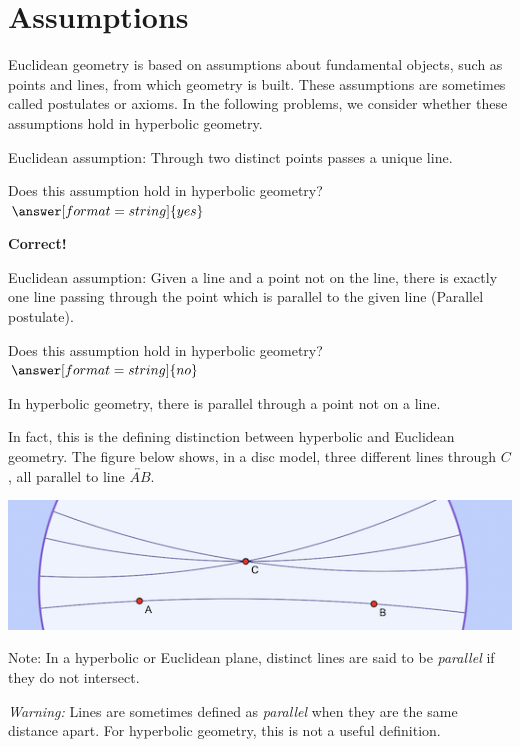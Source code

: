 \documentclass{ximera}
\begin{document}
\section*{Assumptions}
Euclidean geometry is based on assumptions about fundamental objects, such as points and lines, from which geometry is built. These assumptions are sometimes called postulates or axioms. In the following problems, we consider whether these assumptions hold in hyperbolic geometry. 


\begin{problem} %
Euclidean assumption: Through two distinct points passes a unique line.  

Does this assumption hold in hyperbolic geometry? 
$\answer[format=string]{yes}$

\begin{feedback}[correct]
\textbf{Correct!}   
\end{feedback}
\end{problem}

\begin{problem} %
Euclidean assumption: Given a line and a point not on the line, there is exactly one line passing through the point which is parallel to the given line (Parallel postulate).  

Does this assumption hold in hyperbolic geometry? 
$\answer[format=string]{no}$
\begin{problem}
In hyperbolic geometry, there is  parallel through a point not on a line. 
\begin{feedback}[correct]
In fact, this is the defining distinction between hyperbolic and Euclidean geometry.  The figure below shows, in a disc model, three different lines through $C$, all parallel to line $\overleftrightarrow{AB}$.  
\begin{center}
\includegraphics{hyperbolicParallels.png}
\end{center}
Note: In a hyperbolic or Euclidean plane, distinct lines are said to be \emph{parallel} if they do not intersect.  

{\color{red} \emph{Warning:} Lines are sometimes defined as \emph{parallel} when they are the same distance apart.  For hyperbolic geometry, this is not a useful definition.}  
\end{feedback}
\end{problem}
\end{problem}
\end{document}
